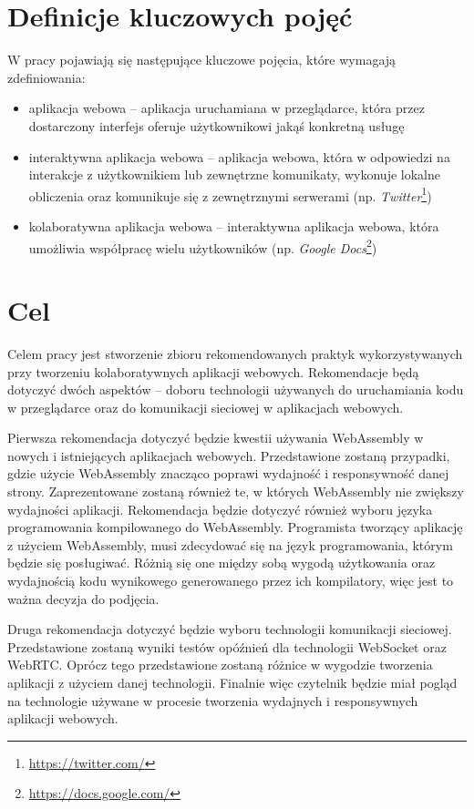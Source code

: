 \documentclass[language=polish,type=master]{aghmodern}
\begin{document}
\pagebreak

\section{Definicje kluczowych pojęć}
W pracy pojawiają się następujące kluczowe pojęcia, które wymagają zdefiniowania:
\begin{itemize}
    \item aplikacja webowa -- aplikacja uruchamiana w przeglądarce, która przez dostarczony interfejs oferuje użytkownikowi jakąś konkretną usługę
    \item interaktywna aplikacja webowa -- aplikacja webowa, która w odpowiedzi na interakcje z użytkownikiem lub zewnętrzne komunikaty, wykonuje lokalne obliczenia oraz komunikuje się z zewnętrznymi serwerami (np. \emph{Twitter}\footnote{\url{https://twitter.com/}})
    \item kolaboratywna aplikacja webowa -- interaktywna aplikacja webowa, która umożliwia współpracę wielu użytkowników (np. \emph{Google Docs}\footnote{\url{https://docs.google.com/}})
\end{itemize}

\section{Cel}
Celem pracy jest stworzenie zbioru rekomendowanych praktyk wykorzystywanych przy tworzeniu kolaboratywnych aplikacji webowych.
Rekomendacje będą dotyczyć dwóch aspektów -- doboru technologii używanych do uruchamiania kodu w przeglądarce oraz do komunikacji sieciowej w aplikacjach webowych.

Pierwsza rekomendacja dotyczyć będzie kwestii używania WebAssembly w nowych i istniejących aplikacjach webowych.
Przedstawione zostaną przypadki, gdzie użycie WebAssembly znacząco poprawi wydajność i responsywność danej strony.
Zaprezentowane zostaną również te, w których WebAssembly nie zwiększy wydajności aplikacji.
Rekomendacja będzie dotyczyć również wyboru języka programowania kompilowanego do WebAssembly.
Programista tworzący aplikację z użyciem WebAssembly, musi zdecydować się na język programowania, którym będzie się posługiwać.
Różnią się one między sobą wygodą użytkowania oraz wydajnością kodu wynikowego generowanego przez ich kompilatory, więc jest to ważna decyzja do podjęcia.

Druga rekomendacja dotyczyć będzie wyboru technologii komunikacji sieciowej.
Przedstawione zostaną wyniki testów opóźnień dla technologii WebSocket oraz WebRTC.
Oprócz tego przedstawione zostaną różnice w wygodzie tworzenia aplikacji z użyciem danej technologii.
Finalnie więc czytelnik będzie miał pogląd na technologie używane w procesie tworzenia wydajnych i responsywnych aplikacji webowych.
\end{document}
